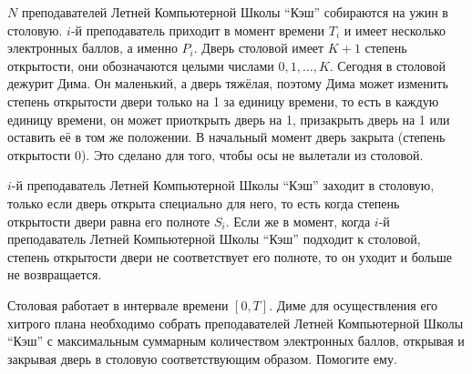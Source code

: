 $N$ преподавателей Летней Компьютерной Школы ``Кэш'' собираются на ужин в столовую. $i$-й преподаватель приходит в момент времени $T_i$ и имеет несколько электронных баллов, а именно $P_i$. Дверь столовой имеет $K + 1$ степень открытости, они обозначаются целыми числами $0, 1, \ldots, K$. Сегодня в столовой дежурит Дима. Он маленький, а дверь тяжёлая, поэтому Дима может изменить степень открытости двери только на 1 за единицу времени, то есть в каждую единицу времени, он может приоткрыть дверь на 1, призакрыть дверь на 1 или оставить её в том же положении. В начальный момент дверь закрыта (степень открытости 0). Это сделано для того, чтобы осы не вылетали из столовой.

$i$-й преподаватель Летней Компьютерной Школы ``Кэш'' заходит в столовую, только если дверь открыта специально для него, то есть когда степень открытости двери равна его полноте $S_i$. Если же в момент, когда $i$-й преподаватель Летней Компьютерной Школы ``Кэш'' подходит к столовой, степень открытости двери не соответствует его полноте, то он уходит и больше не возвращается.

Столовая работает в интервале времени $\left[{}0, T\right]$. Диме для осуществления его хитрого плана необходимо собрать преподавателей Летней Компьютерной Школы ``Кэш'' с максимальным суммарным количеством электронных баллов, открывая и закрывая дверь в столовую соответствующим образом. Помогите ему.